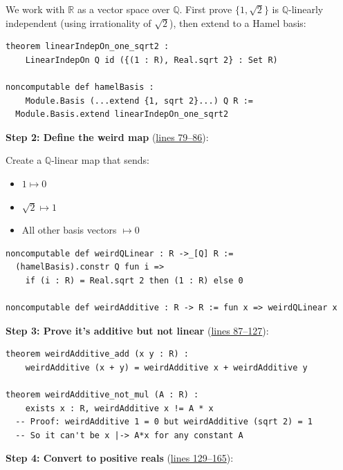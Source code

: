 \documentclass[11pt]{article}
\theoremstyle{definition}
\theoremstyle{remark}
\begin{document}
We work with $\mathbb{R}$ as a vector space over $\mathbb{Q}$. First prove $\{1, \sqrt{2}\}$ is
$\mathbb{Q}$-linearly independent (using irrationality of $\sqrt{2}$), then extend to a Hamel basis:

\begin{lstlisting}[caption={Hamel basis extending $\{1, \sqrt{2}\}$}]
theorem linearIndepOn_one_sqrt2 :
    LinearIndepOn Q id ({(1 : R), Real.sqrt 2} : Set R)

noncomputable def hamelBasis :
    Module.Basis (...extend {1, sqrt 2}...) Q R :=
  Module.Basis.extend linearIndepOn_one_sqrt2
\end{lstlisting}

\textbf{Step 2: Define the weird map} (\href{https://github.com/zariuq/ks-foundations-of-inference/blob/main/KnuthSkilling/Counterexamples/CauchyPathology.lean\#L79-L86}{lines 79--86}):

Create a $\mathbb{Q}$-linear map that sends:
\begin{itemize}
\item $1 \mapsto 0$
\item $\sqrt{2} \mapsto 1$
\item All other basis vectors $\mapsto 0$
\end{itemize}

\begin{lstlisting}[caption={Definition of weirdAdditive}]
noncomputable def weirdQLinear : R ->_[Q] R :=
  (hamelBasis).constr Q fun i =>
    if (i : R) = Real.sqrt 2 then (1 : R) else 0

noncomputable def weirdAdditive : R -> R := fun x => weirdQLinear x
\end{lstlisting}

\textbf{Step 3: Prove it's additive but not linear} (\href{https://github.com/zariuq/ks-foundations-of-inference/blob/main/KnuthSkilling/Counterexamples/CauchyPathology.lean\#L87-L127}{lines 87--127}):

\begin{lstlisting}[caption={weirdAdditive satisfies Cauchy's equation but isn't linear}]
theorem weirdAdditive_add (x y : R) :
    weirdAdditive (x + y) = weirdAdditive x + weirdAdditive y

theorem weirdAdditive_not_mul (A : R) :
    exists x : R, weirdAdditive x != A * x
  -- Proof: weirdAdditive 1 = 0 but weirdAdditive (sqrt 2) = 1
  -- So it can't be x |-> A*x for any constant A
\end{lstlisting}

\textbf{Step 4: Convert to positive reals} (\href{https://github.com/zariuq/ks-foundations-of-inference/blob/main/KnuthSkilling/Counterexamples/CauchyPathology.lean\#L129-L165}{lines 129--165}):
\end{document}
